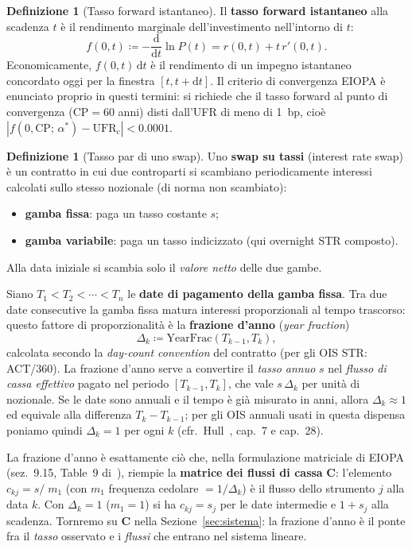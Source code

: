 \documentclass[11pt,a4paper]{article}
\theoremstyle{plain}
\theoremstyle{definition}
\newtheorem{definizione}[teorema]{Definizione}
\theoremstyle{remark}
\newcommand{\UFR}{\mathrm{UFR}}
\newcommand{\CP}{\mathrm{CP}}
\newcommand{\Cmat}{\mathbf{C}}
\newcommand{\defeq}{\coloneqq}
\begin{document}
\begin{definizione}[Tasso forward istantaneo]
Il \textbf{tasso forward istantaneo} alla scadenza $t$ \`e il rendimento
marginale dell'investimento nell'intorno di $t$:
\[
  f(0,t) \defeq -\frac{\mathrm{d}}{\mathrm{d}t}\ln P(t)
               = r(0,t) + t\,r'(0,t).
\]
Economicamente, $f(0,t)\,\mathrm{d}t$ \`e il rendimento di un impegno
istantaneo concordato oggi per la finestra $[t,t+\mathrm{d}t]$.
Il criterio di convergenza EIOPA \`e enunciato proprio in questi termini:
si richiede che il tasso forward al punto di convergenza
($\CP=60$ anni) disti dall'UFR di meno di 1~bp, cio\`e
$|f(0,\CP;\,\alpha^*) - \UFR_c| < 0.0001$.
\end{definizione}

\begin{definizione}[Tasso par di uno swap]
\label{def:tasso_par}
Uno \textbf{swap su tassi} (interest rate swap) \`e un contratto in cui due
controparti si scambiano periodicamente interessi calcolati sullo stesso
nozionale (di norma non scambiato):
\begin{itemize}
  \item \textbf{gamba fissa}: paga un tasso costante $s$;
  \item \textbf{gamba variabile}: paga un tasso indicizzato (qui overnight \texteuro{}STR composto).
\end{itemize}
Alla data iniziale si scambia solo il \emph{valore netto} delle due gambe.

Siano $T_1 < T_2 < \cdots < T_n$ le \textbf{date di pagamento della gamba fissa}.
Tra due date consecutive la gamba fissa matura interessi proporzionali al tempo
trascorso: questo fattore di proporzionalità è la \textbf{frazione d'anno}
(\emph{year fraction})
\[
  \Delta_k \defeq \text{YearFrac}(T_{k-1},T_k),
\]
calcolata secondo la \emph{day-count convention} del contratto (per gli OIS
\texteuro{}STR: ACT/360). La frazione d'anno serve a convertire il \emph{tasso
annuo} $s$ nel \emph{flusso di cassa effettivo} pagato nel periodo $[T_{k-1},T_k]$,
che vale $s\,\Delta_k$ per unità di nozionale. Se le date sono annuali e il tempo
è già misurato in anni, allora $\Delta_k\approx 1$ ed equivale alla differenza
$T_k-T_{k-1}$; per gli OIS annuali usati in questa dispensa poniamo quindi
$\Delta_k = 1$ per ogni $k$ (cfr.\ Hull~\cite{hull2018}, cap.~7 e cap.~28).

\begin{keybox}[Dalla frazione d'anno alla matrice dei flussi $\Cmat$]
La frazione d'anno è esattamente ciò che, nella formulazione matriciale di EIOPA
(sez.~9.15, Table~9 di~\cite{eiopa2025}), riempie la \textbf{matrice dei flussi di
cassa} $\Cmat$: l'elemento $c_{kj}=s/\!\!\;m_{1}$ (con $m_1$ frequenza cedolare
$=1/\Delta_k$) è il flusso dello strumento $j$ alla data $k$. Con $\Delta_k=1$
($m_1=1$) si ha $c_{kj}=s_j$ per le date intermedie e $1+s_j$ alla scadenza.
Tornremo su $\Cmat$ nella Sezione~\ref{sec:sistema}: la frazione d'anno è il ponte
fra il \emph{tasso} osservato e i \emph{flussi} che entrano nel sistema lineare.
\end{keybox}


\end{definizione}
\end{document}
